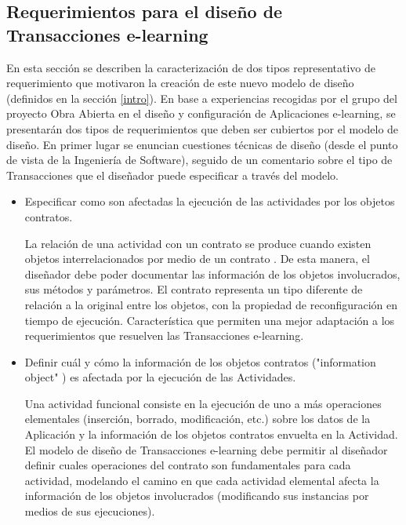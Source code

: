 \subsection{Requerimientos para el diseño de Transacciones e-learning}

En esta sección se describen la caracterización de dos tipos representativo de
requerimiento que motivaron la creación de este nuevo modelo de diseño
(definidos en la sección \ref{intro}). En base a experiencias recogidas por el
grupo del proyecto Obra Abierta en el diseño y configuración de Aplicaciones
e-learning, se presentarán dos tipos de requerimientos que deben ser cubiertos
por el modelo de diseño. En primer lugar se enuncian cuestiones técnicas de
diseño (desde el punto de vista de la Ingeniería de Software), seguido de un
comentario sobre el tipo de Transacciones que el diseñador puede especificar a
través del modelo.

\begin{itemize}

\item Especificar como son afectadas la ejecución de las actividades por los
objetos contratos. 


La relación de una actividad con un contrato se produce cuando existen objetos
interrelacionados por medio de un contrato \cite{fiadeiro}. De esta manera, el
diseñador debe poder documentar las información de los objetos involucrados, sus
métodos y parámetros. El contrato representa un tipo diferente de relación a la
original entre los objetos, con la propiedad de reconfiguración en tiempo de
ejecución. Característica que permiten una mejor adaptación a los requerimientos
que resuelven las Transacciones e-learning.

\item  Definir cuál y cómo la  información de los objetos contratos
("information object" \cite{informationobject}) es afectada por la ejecución de
las Actividades.


Una actividad funcional consiste en la ejecución de uno a más operaciones
elementales (inserción, borrado, modificación, etc.) sobre los datos de la
Aplicación y la información de los objetos contratos envuelta en la Actividad.
El modelo de diseño de Transacciones e-learning debe permitir al diseñador
definir cuales operaciones del contrato son fundamentales para cada actividad,
modelando el camino en que cada actividad elemental afecta la información de los
objetos involucrados (modificando sus instancias por medios de sus ejecuciones).
\end{itemize}


